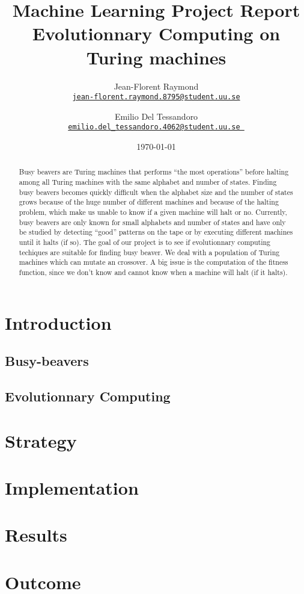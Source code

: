\documentclass{report}
\title{Machine Learning Project Report\\\textbf{Evolutionnary Computing on\\Turing machines}}
\author{Jean-Florent Raymond\\\href{mailto:jean-florent.raymond.8795@student.uu.se}{\texttt{jean-florent.raymond.8795@student.uu.se}} \and Emilio Del Tessandoro\\
\href{mailto:emilio.del_tessandoro.4062@student.uu.se }{\texttt{emilio.del\_tessandoro.4062@student.uu.se }}}
\date{\today}
\begin{document}
\maketitle

\begin{abstract}
  Busy beavers are Turing machines that performs ``the most operations'' before halting among all Turing machines with the same alphabet and number of states. Finding busy beavers becomes quickly difficult when the alphabet size and the number of states grows because of the huge number of different machines and because of the halting problem, which make us unable to know if a given machine will halt or no. Currently, busy beavers are only known for small alphabets and number of states and have only be studied by detecting ``good'' patterns on the tape or by executing different machines until it halts (if so).
The goal of our project is to see if evolutionnary computing techiques are suitable for finding busy beaver. We deal with a population of Turing machines which can mutate an crossover. A big issue is the computation of the fitness function, since we don't know and cannot know when a machine will halt (if it halts).
\end{abstract}

\chapter{Introduction}
\label{chap:intro}

\section{Busy-beavers}
\label{chap:bb}

\section{Evolutionnary Computing}
\label{chap:ec}

\chapter{Strategy}
\label{chap:strategy}

\chapter{Implementation}
\label{chap:impl}

\chapter{Results}
\label{chap:results}

\chapter{Outcome}
\label{chap:outcome}
\end{document}
